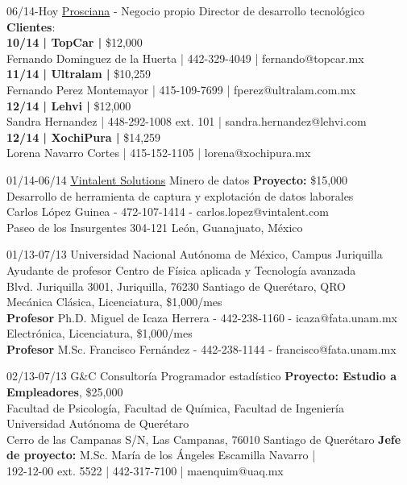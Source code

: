 \documentclass[]{friggeri-cv}
\begin{document}
\begin{entrylist}
\entry
{06/14-Hoy}
{\href{http://www.prosciana.com}{Prosciana} - Negocio propio}
{Director de desarrollo tecnol\'{o}gico}
{\textbf{Clientes}:\\
\textbf{10/14 | TopCar |  } \$12,000  \\Fernando Dominguez de la Huerta | 442-329-4049 | fernando@topcar.mx \\
\textbf{11/14 | Ultralam | } \$10,259 \\Fernando Perez Montemayor | 415-109-7699 | fperez@ultralam.com.mx\\
\textbf{12/14 | Lehvi |  } \$12,000 \\Sandra Hernandez | 448-292-1008 ext. 101 | sandra.hernandez@lehvi.com\\
\textbf{12/14 | XochiPura | } \$14,259 \\Lorena Navarro Cortes | 415-152-1105 | lorena@xochipura.mx
}


\entry
{01/14-06/14}
{\href{http://www.vintalent.com}{Vintalent Solutions}}
{Minero de datos}
{\textbf{Proyecto:} \$15,000\\
Desarrollo de herramienta de captura y explotaci\'{o}n de datos laborales\\
Carlos L\'{o}pez Guinea - 472-107-1414 - carlos.lopez@vintalent.com\\
Paseo de los Insurgentes 304-121 Le\'{o}n, Guanajuato, M\'{e}xico
 }


\entry
{01/13-07/13}
{Universidad Nacional Aut\'{o}noma de M\'{e}xico, Campus Juriquilla
}
{Ayudante de profesor}
{Centro de F\'{i}sica aplicada y Tecnolog\'{i}a avanzada\\
Blvd. Juriquilla 3001, Juriquilla, 76230 Santiago de Quer\'{e}taro, QRO\\
Mec\'{a}nica Cl\'{a}sica, Licenciatura, \$1,000/mes \\
\textbf{Profesor} Ph.D. Miguel de Icaza Herrera - 442-238-1160 - icaza@fata.unam.mx\\
Electr\'{o}nica, Licenciatura, \$1,000/mes \\
\textbf{Profesor} M.Sc. Francisco Fern\'{a}ndez - 442-238-1144 - francisco@fata.unam.mx}

\entry
{02/13-07/13}
{G\&C Consultor\'{i}a}
{Programador estad\'{i}stico}
{\textbf{Proyecto: Estudio a Empleadores}, \$25,000\\
Facultad de Psicolog\'{i}a, Facultad de Qu\'{i}mica, Facultad de Ingenier\'{i}a\\
Universidad Aut\'{o}noma de Quer\'{e}taro\\
Cerro de las Campanas S/N, Las Campanas, 76010 Santiago de Quer\'{e}taro
\textbf{Jefe de proyecto:} M.Sc. Mar\'{i}a de los \'{A}ngeles Escamilla Navarro | \\
192-12-00 ext. 5522 | 442-317-7100 | maenquim@uaq.mx}




\end{entrylist}
\end{document}
